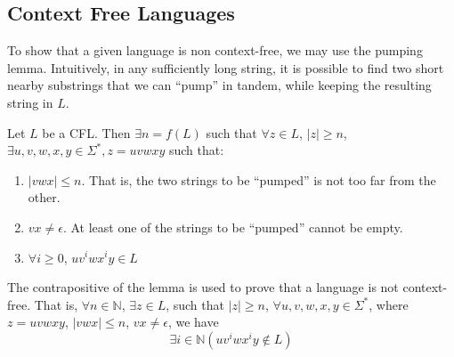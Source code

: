 \subsection{Context Free Languages}
To show that a given language is non context-free, we may use the pumping
lemma. Intuitively, in any sufficiently long string, it is possible to find two
short nearby substrings that we can ``pump'' in tandem, while keeping the
resulting string in $L$.
\begin{lemma}
  Let $L$ be a CFL\@. Then $\exists n=f(L)$ such that $\forall z\in L$,
  $\left| z \right| \ge n$, $\exists u,v,w,x,y\in \Sigma^{*},z=uvwxy$ such that:
  \begin{enumerate}
    \item $\left| vwx \right| \le n$. That is, the two strings to be ``pumped''
      is not too far from the other.
    \item $vx\neq\epsilon$. At least one of the strings to be ``pumped'' cannot be empty.
    \item $\forall i\ge 0$, $uv^{i}wx^{i}y\in L$
  \end{enumerate}
\end{lemma}
The contrapositive of the lemma is used to prove that a language is
not context-free. That is, $\forall n\in \mathbb{N}$, $\exists z\in L$, such
that $\left| z \right| \ge n$, $\forall u,v,w,x,y\in \Sigma^{*}$, where
$z=uvwxy$, $\left| vwx \right| \le n$, $vx\neq\epsilon$, we have
\[\exists i\in \mathbb{N}\left( uv^{i}wx^{i}y\notin L \right)\]

